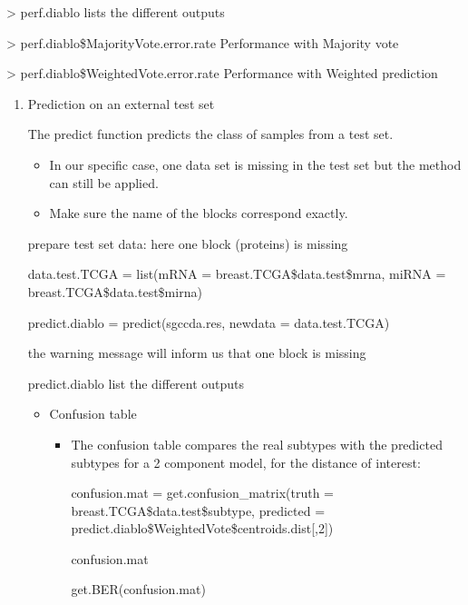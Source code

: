 \documentclass[
]{book}
\begin{document}
\begin{enumerate}
\begin{itemize}
    \textgreater{} perf.diablo lists the different outputs

    \textgreater{} perf.diablo\$MajorityVote.error.rate Performance with Majority vote

    \textgreater{} perf.diablo\$WeightedVote.error.rate Performance with Weighted prediction

    \begin{enumerate}
    \def\labelenumii{\arabic{enumii}.}
    \item
      Prediction on an external test set

      The predict function predicts the class of samples from a test set.

      \begin{itemize}
      \item
        In our specific case, one data set is missing in the test set but the method can still be applied.
      \item
        Make sure the name of the blocks correspond exactly.
      \end{itemize}

      prepare test set data: here one block (proteins) is missing

      data.test.TCGA = list(mRNA = breast.TCGA\$data.test\$mrna, miRNA = breast.TCGA\$data.test\$mirna)

      predict.diablo = predict(sgccda.res, newdata = data.test.TCGA)

      the warning message will inform us that one block is missing

      predict.diablo list the different outputs

      \begin{itemize}
      \item
        Confusion table

        \begin{itemize}
        \item
          The confusion table compares the real subtypes with the predicted subtypes for a 2 component model, for the distance of interest:

          confusion.mat = get.confusion\_matrix(truth = breast.TCGA\$data.test\$subtype, predicted = predict.diablo\$WeightedVote\$centroids.dist{[},2{]})

          confusion.mat

          get.BER(confusion.mat)
        \end{itemize}
      \end{itemize}
    \end{enumerate}
  \end{itemize}
\end{enumerate}
\end{document}
